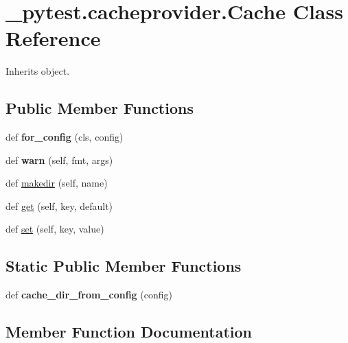 \hypertarget{class__pytest_1_1cacheprovider_1_1_cache}{}\section{\+\_\+pytest.\+cacheprovider.\+Cache Class Reference}
\label{class__pytest_1_1cacheprovider_1_1_cache}


Inherits object.

\subsection*{Public Member Functions}
\begin{DoxyCompactItemize}
\item 
\mbox{\label{class__pytest_1_1cacheprovider_1_1_cache_af4a86ac1036af0761f3c9076dd33fb4a}} 
def {\bfseries for\+\_\+config} (cls, config)
\item 
\mbox{\label{class__pytest_1_1cacheprovider_1_1_cache_ac2cfea5bbe9d51ea01e35296686cf95b}} 
def {\bfseries warn} (self, fmt, args)
\item 
def \hyperlink{class__pytest_1_1cacheprovider_1_1_cache_a127fc1232969fda6de872312d8520059}{makedir} (self, name)
\item 
def \hyperlink{class__pytest_1_1cacheprovider_1_1_cache_afb5455632ee3d406b3226f63f7a3cca7}{get} (self, key, default)
\item 
def \hyperlink{class__pytest_1_1cacheprovider_1_1_cache_a5ae178e79e86425ce2c56dfcf96bbf3b}{set} (self, key, value)
\end{DoxyCompactItemize}
\subsection*{Static Public Member Functions}
\begin{DoxyCompactItemize}
\item 
\mbox{\label{class__pytest_1_1cacheprovider_1_1_cache_a8f4e5b9af32d799f9c00c160ceb27915}} 
def {\bfseries cache\+\_\+dir\+\_\+from\+\_\+config} (config)
\end{DoxyCompactItemize}


\subsection{Member Function Documentation}
\mbox{\label{class__pytest_1_1cacheprovider_1_1_cache_afb5455632ee3d406b3226f63f7a3cca7}} 
